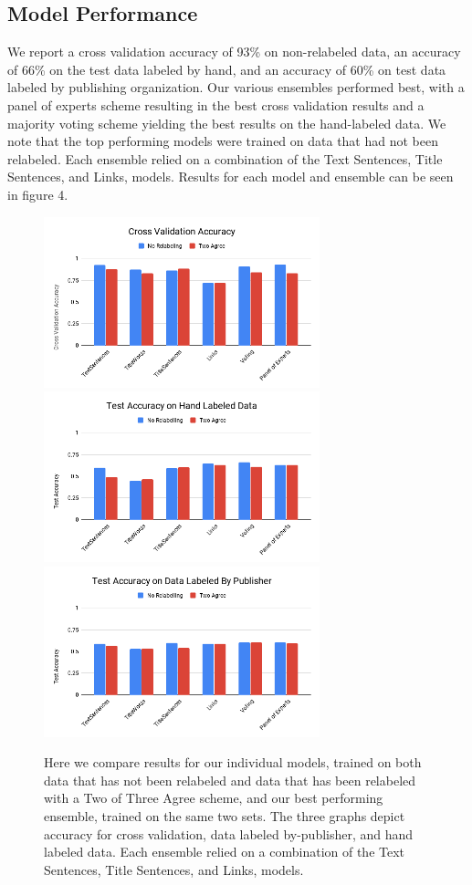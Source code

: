 \documentclass[11pt,a4paper]{article}
\begin{document}
\subsection{Model Performance}
We report a cross validation accuracy of 93\% on non-relabeled data, an accuracy of 66\% on the test data labeled by hand, and an accuracy of 60\%  on test data labeled by publishing organization. Our various ensembles performed best, with a panel of experts scheme resulting in the best cross validation results and a majority voting scheme yielding the best results on the hand-labeled data. We note that the top performing models were trained on data that had not been relabeled. Each ensemble relied on a combination of the Text Sentences, Title Sentences, and Links, models. Results for each model and ensemble can be seen in figure 4. 
\begin{figure}[ht!]
\caption{Here we compare results for our individual models, trained on both data that has not been relabeled and data that has been relabeled with a Two of Three Agree scheme, and our best performing ensemble, trained on the same two sets. The three graphs depict accuracy for cross validation, data labeled by-publisher, and hand labeled data. Each ensemble relied on a combination of the Text Sentences, Title Sentences, and Links, models.}
\includegraphics[width=8cm]{images/models_cross_val.png}
\includegraphics[width=8cm]{images/models_by_hand.png}
\includegraphics[width=8cm]{images/models_by_pub.png} 
\end{figure}
\end{document}

